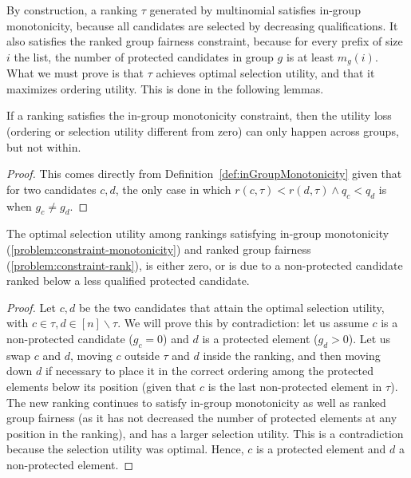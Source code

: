 By construction, a ranking $\tau$ generated by multinomial \algoFAIR satisfies in-group monotonicity, because all candidates are selected by decreasing qualifications.
%
It also satisfies the ranked group fairness constraint, because for every prefix of size $i$ the list, the number of protected candidates in group $g$ is at least $m_g(i)$. 
%
What we must prove is that $\tau$ achieves optimal selection utility, and that it maximizes ordering utility. 
%
This is done in the following lemmas.

\begin{lemma}\label{lemma:across}
	If a ranking satisfies the in-group monotonicity constraint, then the utility loss (ordering or selection utility different from zero) can only happen across groups, but not within.
\end{lemma}

\begin{proof}
	This comes directly from Definition~\ref{def:inGroupMonotonicity} given that for two candidates $c,d$, the only case in which $r(c,\tau) < r(d,\tau) \wedge q_c < q_d$ is when $g_c \ne g_d$.
\end{proof}

\begin{lemma}
	The optimal selection utility among rankings satisfying in-group monotonicity (\ref{problem:constraint-monotonicity}) and ranked group fairness (\ref{problem:constraint-rank}), is either zero, or is due to a non-protected candidate ranked below a less qualified protected candidate.
\end{lemma}

\begin{proof}
	Let $c,d$ be the two candidates that attain the optimal selection utility, with $c \in \tau, d \in [n] \backslash \tau$.
	We will prove this by contradiction: let us assume $c$ is a non-protected candidate ($g_c=0$) and $d$ is a protected element ($g_d>0$). 
	Let us swap $c$ and $d$, moving $c$ outside $\tau$ and $d$ inside the ranking, and then moving down $d$ if necessary to place it in the correct ordering among the protected elements below its position (given that $c$ is the last non-protected element in $\tau$). 
	The new ranking continues to satisfy in-group monotonicity as well as ranked group fairness (as it has not decreased the number of protected elements at any position in the ranking), and has a larger selection utility. 
	This is a contradiction because the selection utility was optimal. Hence, $c$ is a protected element and $d$ a non-protected element.
\end{proof}

